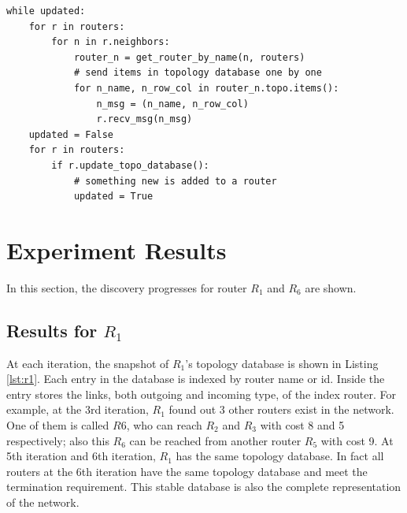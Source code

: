 \documentclass[12pt]{article}  %
\theoremstyle{definition}
\theoremstyle{remark}
\begin{document}
\begin{lstlisting}
while updated:
    for r in routers:
        for n in r.neighbors:
            router_n = get_router_by_name(n, routers)
            # send items in topology database one by one
            for n_name, n_row_col in router_n.topo.items():
                n_msg = (n_name, n_row_col)
                r.recv_msg(n_msg)
    updated = False
    for r in routers:
        if r.update_topo_database():
            # something new is added to a router
            updated = True
\end{lstlisting}

\section{Experiment Results}
In this section, the discovery progresses for router $R_1$ and $R_6$ are shown.

\subsection{Results for $R_1$}
At each iteration, the snapshot of $R_1$'s topology database is shown in Listing \ref{lst:r1}.
Each entry in the database is indexed by router name or id.
Inside the entry stores the links, both outgoing and incoming type, of the index router.
For example, at the 3rd iteration, $R_1$ found out 3 other routers exist in the network.
One of them is called $R6$, who can reach $R_2$ and $R_3$ with cost 8 and 5 respectively;
also this $R_6$ can be reached from another router $R_5$ with cost 9.
At 5th iteration and 6th iteration, $R_1$ has the same topology database.
In fact all routers at the 6th iteration have the same topology database and meet the termination requirement.
This stable database is also the complete representation of the network.
\end{document}
